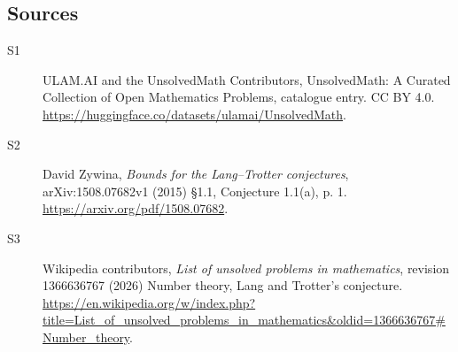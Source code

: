 \documentclass[11pt]{article}
\begin{document}
\subsection{Sources}
\begin{description}
\item[\hypertarget{source:statement:1}{S1}] ULAM.AI and the UnsolvedMath Contributors, UnsolvedMath: A Curated Collection of Open Mathematics Problems, catalogue entry. CC BY 4.0. \url{https://huggingface.co/datasets/ulamai/UnsolvedMath}.
\item[\hypertarget{source:statement:2}{S2}] David Zywina, \emph{Bounds for the Lang--Trotter conjectures}, arXiv:1508.07682v1 (2015) \S1.1, Conjecture 1.1(a), p. 1. \url{https://arxiv.org/pdf/1508.07682}.
\item[\hypertarget{source:statement:3}{S3}] Wikipedia contributors, \emph{List of unsolved problems in mathematics}, revision 1366636767 (2026) Number theory, Lang and Trotter's conjecture. \url{https://en.wikipedia.org/w/index.php?title=List_of_unsolved_problems_in_mathematics&oldid=1366636767#Number_theory}.
\end{description}
\label{end:statement}
\end{document}
